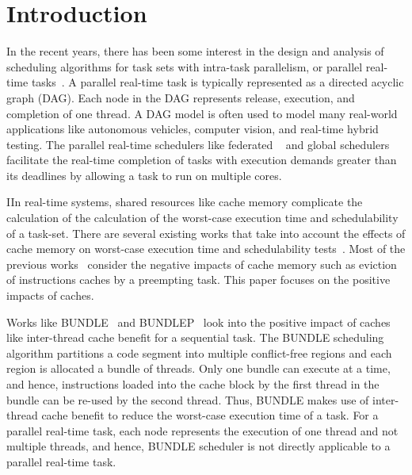 \section{Introduction}
In the recent years, there has been some interest in the design and analysis of scheduling algorithms for task sets with intra-task parallelism, or parallel real-time tasks~\cite{li2014federated, baruah2015federated, ueter2018reservation, saifullah2013multi, lakshmanan2010scheduling, baruah2015global, li2013, li2014analysis, bonifaci2013feasibility, andersson2012analyzing, baruah2014improved, serrano2016response}. A parallel real-time task is typically represented as a directed acyclic graph (DAG). Each node in the DAG represents release, execution, and completion of one thread.  A DAG model is often used to model many real-world applications like autonomous vehicles, computer vision, and real-time hybrid testing. The parallel real-time schedulers like federated ~\cite{li2014federated, baruah2015federated, ueter2018reservation} and global schedulers~\cite{ saifullah2013multi, lakshmanan2010scheduling, baruah2015global} facilitate the real-time completion of tasks with execution demands greater than its deadlines by allowing a task to run on multiple cores.  

IIn real-time systems, shared resources like cache memory complicate the calculation of the calculation of the worst-case execution time and schedulability of a task-set.  There are several existing works that take into account the effects of cache memory on worst-case execution time and schedulability tests~\cite{Tomiyama:2000, tan:2007, ee:1998, altmeyer:2011, negi:2003, altmeyer:2012, Li:2009, zhang2016cache, chattopadhyay2014cache, Calandrino:2009, tessler:2016, tessler:2018}. Most of the previous works~\cite{Tomiyama:2000, tan:2007, ee:1998, altmeyer:2011, negi:2003, altmeyer:2012, Li:2009, zhang2016cache, chattopadhyay2014cache} consider the negative impacts of cache memory such as eviction of instructions caches by a preempting task.  This paper focuses on the positive impacts of caches.

Works like BUNDLE~\cite{tessler:2016} and BUNDLEP~\cite{ tessler:2018} look into the positive impact of caches like inter-thread cache benefit for a sequential task. The BUNDLE scheduling algorithm partitions a code segment into multiple conflict-free regions and each region is allocated a bundle of threads. Only one bundle can execute at a time, and hence, instructions loaded into the cache block by the first thread in the bundle can be re-used by the second thread. Thus, BUNDLE makes use of inter-thread cache benefit to reduce the worst-case execution time of a task. For a parallel real-time task, each node represents the execution of one thread and not multiple threads, and hence, BUNDLE scheduler is not directly applicable to a parallel real-time task.  

